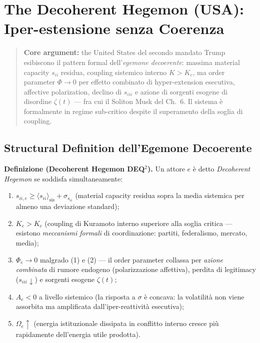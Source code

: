 \chapter{The Decoherent Hegemon (USA): Iper-estensione senza
Coerenza}\label{legemone-decoerente-usa-hyper-extension-senza-coerenza}

\begin{quote}
\textbf{Core argument:} the United States del secondo mandato Trump
esibiscono il pattern formal dell'\emph{egemone decoerente}: massima
material capacity \(s_{ii}\) residua, coupling sistemico interno
\(K > K_c\), ma order parameter \(\Phi \to 0\) per effetto combinato
di hyper-extension esecutiva, affective polarization, declino di
\(s_{iii}\) e azione di sorgenti esogene di disordine \(\zeta(t)\) ---
fra cui il Soliton Musk del Ch.~6. Il sistema è formalmente in regime
sub-critico despite il superamento della soglia di coupling.
\end{quote}



\section{Structural Definition dell'Egemone
Decoerente}\label{definition-structural-dellegemone-decoerente}

\Hypoth{} \textbf{Definizione (Decoherent Hegemon DEQ$^2$).} Un attore
\(e\) è detto \emph{Decoherent Hegemon} se soddisfa simultaneamente:

\begin{enumerate}
\def\labelenumi{\arabic{enumi}.}
\tightlist
\item
  \(s_{ii,e} \geq \langle s_{ii} \rangle_{\text{sis}} + \sigma_{s_{ii}}\)
  (material capacity residua sopra la media sistemica per almeno una
  deviazione standard);
\item
  \(K_e > K_c\) (coupling di Kuramoto interno superiore alla soglia
  critica --- esistono \emph{meccanismi formali} di coordinazione:
  partiti, federalismo, mercato, media);
\item
  \(\Phi_e \to 0\) malgrado (1) e (2) --- il order parameter collassa
  per \emph{azione combinata} di rumore endogeno (polarizzazione
  affettiva), perdita di legitimacy (\(s_{iii} \downarrow\)) e sorgenti
  esogene \(\zeta(t)\);
\item
  \(A_e < 0\) a livello sistemico (la risposta a \(\sigma\) è concava:
  la volatilità non viene assorbita ma amplificata dall'iper-reattività
  esecutiva);
\item
  \(\Omega_e \uparrow\) (energia istituzionale dissipata in conflitto
  interno cresce più rapidamente dell'energia utile prodotta).
\end{enumerate}

